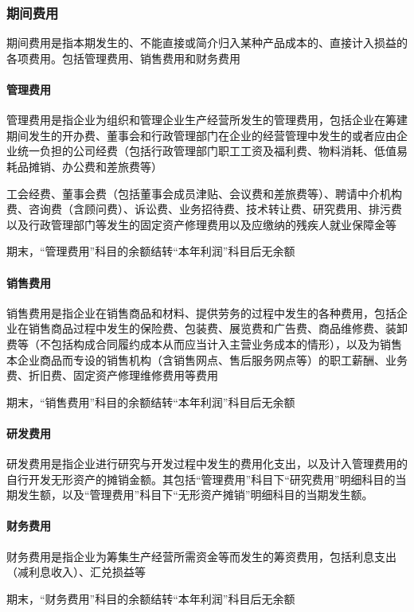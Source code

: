 \documentclass[UTF8,12pt]{ctexart}
\numberwithin{equation}{section} %
\numberwithin{figure}{section}
\numberwithin{table}{section}
\begin{document}
	\subsubsection{期间费用}
	期间费用是指本期发生的、不能直接或简介归入某种产品成本的、直接计入损益的各项费用。包括管理费用、销售费用和财务费用
	
	\paragraph{管理费用}
	管理费用是指企业为组织和管理企业生产经营所发生的管理费用，包括企业在筹建期间发生的开办费、董事会和行政管理部门在企业的经营管理中发生的或者应由企业统一负担的公司经费（包括行政管理部门职工工资及福利费、物料消耗、低值易耗品摊销、办公费和差旅费等）
	
	工会经费、董事会费（包括董事会成员津贴、会议费和差旅费等）、聘请中介机构费、咨询费（含顾问费）、诉讼费、业务招待费、技术转让费、研究费用、排污费以及行政管理部门等发生的固定资产修理费用以及应缴纳的残疾人就业保障金等
	
	期末，“管理费用”科目的余额结转“本年利润”科目后无余额
	
	\paragraph{销售费用}
	销售费用是指企业在销售商品和材料、提供劳务的过程中发生的各种费用，包括企业在销售商品过程中发生的保险费、包装费、展览费和广告费、商品维修费、装卸费等（不包括构成合同履约成本从而应当计入主营业务成本的情形），以及为销售本企业商品而专设的销售机构（含销售网点、售后服务网点等）的职工薪酬、业务费、折旧费、固定资产修理维修费用等费用
	
	期末，“销售费用”科目的余额结转“本年利润”科目后无余额
	
	\paragraph{研发费用}
	研发费用是指企业进行研究与开发过程中发生的费用化支出，以及计入管理费用的自行开发无形资产的摊销金额。其包括“管理费用”科目下“研究费用”明细科目的当期发生额，以及“管理费用”科目下“无形资产摊销”明细科目的当期发生额。
	
	\paragraph{财务费用}
	财务费用是指企业为筹集生产经营所需资金等而发生的筹资费用，包括利息支出（减利息收入）、汇兑损益等
	
	期末，“财务费用”科目的余额结转“本年利润”科目后无余额
	
\end{document}
